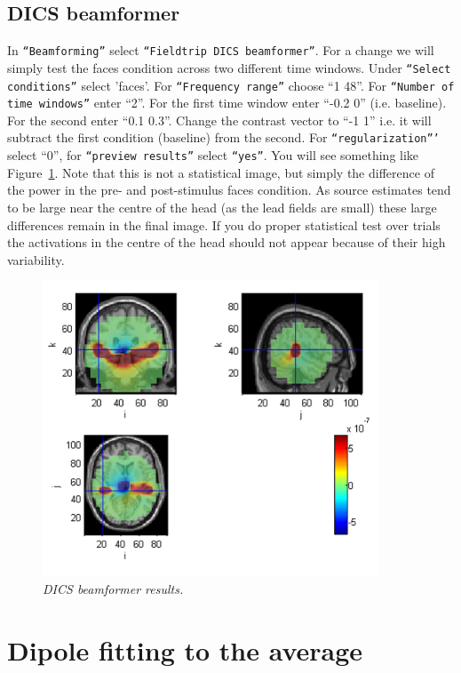 \subsection{DICS beamformer}
In \texttt{``Beamforming''} select \texttt{``Fieldtrip DICS beamformer''}. For a change we will simply test the faces condition across two different time windows. Under \texttt{``Select conditions''} select 'faces'. For \texttt{``Frequency range''} choose ``1 48''. For \texttt{``Number of time windows''} enter ``2''. For the first time window enter ``-0.2 0'' (i.e. baseline). For the second enter ``0.1 0.3''. Change the contrast vector to ``-1 1'' i.e. it will subtract the first condition (baseline) from the second. For \texttt{``regularization'''} select ``0'', for \texttt{``preview results''} select \texttt{``yes''}. You will see something like Figure~\ref{meg_sloc:fig:13}. Note that this is not a statistical image, but simply the difference of the power in the pre- and post-stimulus faces condition.  As source estimates tend to be large near the centre of the head (as the lead fields are small) these large differences remain in the final image. If you do proper statistical test over trials the activations in the centre of the head should not appear because of their high variability.

\begin{figure}
\begin{center}
\includegraphics[width=100mm]{meg_sloc/Slide13}
\caption{\em DICS beamformer results.\label{meg_sloc:fig:13}}
\end{center}
\end{figure}

\section{Dipole fitting to the average}

